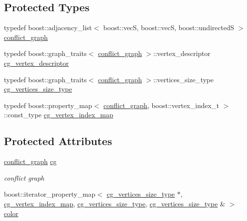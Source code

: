 \subsection*{Protected Types}
\begin{DoxyCompactItemize}
\item 
typedef boost\+::adjacency\+\_\+list$<$ boost\+::vecS, boost\+::vecS, boost\+::undirectedS $>$ \hyperlink{classconflict__based__register_ae3dddabefe4d2f171c7076d0c1c22f05}{conflict\+\_\+graph}
\item 
typedef boost\+::graph\+\_\+traits$<$ \hyperlink{classconflict__based__register_ae3dddabefe4d2f171c7076d0c1c22f05}{conflict\+\_\+graph} $>$\+::vertex\+\_\+descriptor \hyperlink{classconflict__based__register_abddaef9f848ebfcf63783a6a3749ca78}{cg\+\_\+vertex\+\_\+descriptor}
\item 
typedef boost\+::graph\+\_\+traits$<$ \hyperlink{classconflict__based__register_ae3dddabefe4d2f171c7076d0c1c22f05}{conflict\+\_\+graph} $>$\+::vertices\+\_\+size\+\_\+type \hyperlink{classconflict__based__register_a7708aaa8ca3c7edc5006102d258ce126}{cg\+\_\+vertices\+\_\+size\+\_\+type}
\item 
typedef boost\+::property\+\_\+map$<$ \hyperlink{classconflict__based__register_ae3dddabefe4d2f171c7076d0c1c22f05}{conflict\+\_\+graph}, boost\+::vertex\+\_\+index\+\_\+t $>$\+::const\+\_\+type \hyperlink{classconflict__based__register_a4244cac2851e9a316f0debd0563dd2d2}{cg\+\_\+vertex\+\_\+index\+\_\+map}
\end{DoxyCompactItemize}
\subsection*{Protected Attributes}
\begin{DoxyCompactItemize}
\item 
\hyperlink{classconflict__based__register_ae3dddabefe4d2f171c7076d0c1c22f05}{conflict\+\_\+graph} \hyperlink{classconflict__based__register_ab595177e8e1f8a5b3e2835a2ddd2a7cf}{cg}
\begin{DoxyCompactList}\small\item\em conflict graph \end{DoxyCompactList}\item 
boost\+::iterator\+\_\+property\+\_\+map$<$ \hyperlink{classconflict__based__register_a7708aaa8ca3c7edc5006102d258ce126}{cg\+\_\+vertices\+\_\+size\+\_\+type} $\ast$, \hyperlink{classconflict__based__register_a4244cac2851e9a316f0debd0563dd2d2}{cg\+\_\+vertex\+\_\+index\+\_\+map}, \hyperlink{classconflict__based__register_a7708aaa8ca3c7edc5006102d258ce126}{cg\+\_\+vertices\+\_\+size\+\_\+type}, \hyperlink{classconflict__based__register_a7708aaa8ca3c7edc5006102d258ce126}{cg\+\_\+vertices\+\_\+size\+\_\+type} \& $>$ \hyperlink{classconflict__based__register_afcda446d7720ae3841f8b5cdf1517eec}{color}
\end{DoxyCompactItemize}
